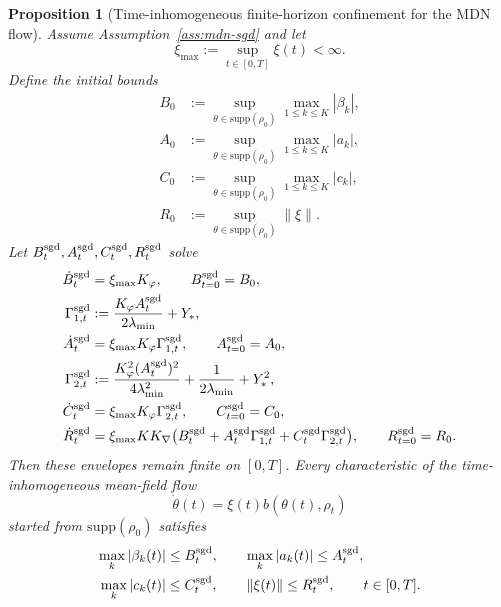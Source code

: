 \documentclass[11pt]{article}
\newtheorem{proposition}[theorem]{Proposition}
\theoremstyle{definition}
\newcommand{\supp}{\mathrm{supp}}
\newcommand{\norm}[1]{\left\lVert #1 \right\rVert}
\begin{document}
\begin{proposition}[Time-inhomogeneous finite-horizon confinement for the MDN flow]
\label{prop:mdn-confinement}
Assume Assumption~\ref{ass:mdn-sgd} and let
\[
  \xi_{\max}:=\sup_{t\in[0,T]}\xi(t)<\infty.
\]
Define the initial bounds
\begin{align*}
  B_0
  &:=
  \sup_{\theta\in\supp(\rho_0)}\max_{1\le k\le K}|\beta_k|,
  \\
  A_0
  &:=
  \sup_{\theta\in\supp(\rho_0)}\max_{1\le k\le K}|a_k|,
  \\
  C_0
  &:=
  \sup_{\theta\in\supp(\rho_0)}\max_{1\le k\le K}|c_k|,
  \\
  R_0
  &:=
  \sup_{\theta\in\supp(\rho_0)}\norm{\xi}.
\end{align*}
Let $B_t^{\rm sgd},A_t^{\rm sgd},C_t^{\rm sgd},R_t^{\rm sgd}$ solve
\begin{align}
  \dot B_t^{\rm sgd}
  &=
  \xi_{\max}K_\varphi,
  \qquad
  B_{t=0}^{\rm sgd}=B_0,
  \label{eq:B-envelope-mdn-sgd}
  \\
  \Gamma_{1,t}^{\rm sgd}
  &:=
  \frac{K_\varphi A_t^{\rm sgd}}{2\lambda_{\min}}+Y_\ast,
  \label{eq:Gamma1-mdn-sgd}
  \\
  \dot A_t^{\rm sgd}
  &=
  \xi_{\max}K_\varphi \Gamma_{1,t}^{\rm sgd},
  \qquad
  A_{t=0}^{\rm sgd}=A_0,
  \label{eq:A-envelope-mdn-sgd}
  \\
  \Gamma_{2,t}^{\rm sgd}
  &:=
  \frac{K_\varphi^2 (A_t^{\rm sgd})^2}{4\lambda_{\min}^2}
  +
  \frac{1}{2\lambda_{\min}}
  +
  Y_\ast^2,
  \label{eq:Gamma2-mdn-sgd}
  \\
  \dot C_t^{\rm sgd}
  &=
  \xi_{\max}K_\varphi \Gamma_{2,t}^{\rm sgd},
  \qquad
  C_{t=0}^{\rm sgd}=C_0,
  \label{eq:C-envelope-mdn-sgd}
  \\
  \dot R_t^{\rm sgd}
  &=
  \xi_{\max}K K_\nabla
  \big(
    B_t^{\rm sgd}
    +
    A_t^{\rm sgd}\Gamma_{1,t}^{\rm sgd}
    +
    C_t^{\rm sgd}\Gamma_{2,t}^{\rm sgd}
  \big),
  \qquad
  R_{t=0}^{\rm sgd}=R_0.
  \label{eq:R-envelope-mdn-sgd}
\end{align}
Then these envelopes remain finite on $[0,T]$. Every characteristic of the
time-inhomogeneous mean-field flow
\[
  \dot\theta(t)=\xi(t)b(\theta(t),\rho_t)
\]
started from $\supp(\rho_0)$ satisfies
\[
  \begin{aligned}
    \max_k|\beta_k(t)|&\le B_t^{\rm sgd},
    \qquad
    \max_k|a_k(t)|\le A_t^{\rm sgd},
    \\
    \max_k|c_k(t)|&\le C_t^{\rm sgd},
    \qquad
    \norm{\xi(t)}\le R_t^{\rm sgd},
    \qquad t\in[0,T].
  \end{aligned}
\]
\end{proposition}
\end{document}
